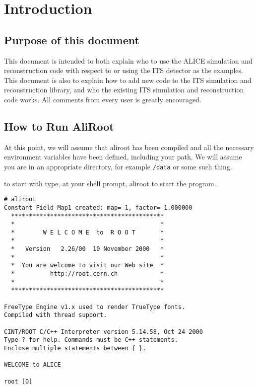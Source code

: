 \chapter*{Introduction}
\section*{Purpose of this document}

This document is intended to both explain who to use the ALICE simulation and
reconstruction code with respect to or using the ITS detector as the
examples. This document is also to explain how to add new code to the ITS
simulation and reconstruction library, and who the existing ITS simulation and
reconstruction code works. All comments from every user is greatly encouraged.

\section*{How to Run AliRoot}

At this point, we will assume that aliroot has been compiled and all the
necessary environment variables have been defined, including your path. We will
assume you are in an appropriate directory, for example \texttt{/data} or some
such thing.

to start with type, at your shell prompt, aliroot to start the program.

\begin{verbatim}
# aliroot
Constant Field Map1 created: map= 1, factor= 1.000000
  *******************************************
  *                                         *
  *        W E L C O M E  to  R O O T       *
  *                                         *
  *   Version   2.26/00  10 November 2000   *
  *                                         *
  *  You are welcome to visit our Web site  *
  *          http://root.cern.ch            *
  *                                         *
  *******************************************

FreeType Engine v1.x used to render TrueType fonts.
Compiled with thread support.

CINT/ROOT C/C++ Interpreter version 5.14.58, Oct 24 2000
Type ? for help. Commands must be C++ statements.
Enclose multiple statements between { }.

WELCOME to ALICE

root [0]
\end{verbatim}

